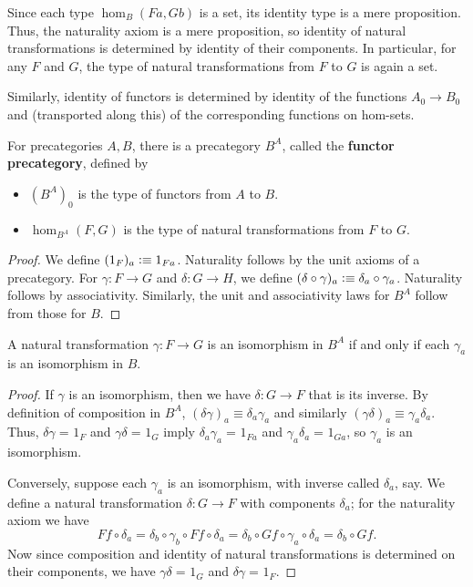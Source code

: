 \documentclass[10pt,a4paper]{article}
\providecommand{\index}[1]{}
\newcommand{\jdeq}{\equiv}      %
\newcommand{\defeq}{\vcentcolon\equiv}  %
\newcommand{\define}[1]{\textbf{#1}}
\newcommand{\id}[3][]{\ensuremath{#2 =_{#1} #3}\xspace}
\theoremstyle{definition}
\theoremstyle{remark}
\numberwithin{equation}{section}
\newcommand{\indexdef}[1]{\index{#1|defstyle}}   %
\begin{document}
Since each type $\hom_B(Fa,Gb)$ is a set, its identity type is a mere proposition.
Thus, the naturality axiom is a mere proposition, so identity of natural transformations is determined by identity of their components.
In particular, for any $F$ and $G$, the type of natural transformations from $F$ to $G$ is again a set.

Similarly, identity of functors is determined by identity of the functions $A_0\to B_0$ and (transported along this) of the corresponding functions on hom-sets.

\begin{defn}\label{ct:functor-precat}
  \indexdef{precategory!of functors}%
  For precategories $A,B$, there is a precategory $B^A$, called the \define{functor precategory}, defined by
  \begin{itemize}
  \item $(B^A)_0$ is the type of functors from $A$ to $B$.
  \item $\hom_{B^A}(F,G)$ is the type of natural transformations from $F$ to $G$.
  \end{itemize}
\end{defn}
\begin{proof}
  We define $(1_F)_a\defeq 1_{Fa}$.
  Naturality follows by the unit axioms of a precategory.
  For $\gamma:F\to G$ and $\delta:G\to H$, we define $(\delta\circ\gamma)_a\defeq \delta_a\circ \gamma_a$.
  Naturality follows by associativity.
  Similarly, the unit and associativity laws for $B^A$ follow from those for $B$.
\end{proof}

\begin{lem}\label{ct:natiso}
  \index{natural!isomorphism}%
  \index{isomorphism!natural}%
  A natural transformation $\gamma:F\to G$ is an isomorphism in $B^A$ if and only if each $\gamma_a$ is an isomorphism in $B$.
\end{lem}
\begin{proof}
  If $\gamma$ is an isomorphism, then we have $\delta:G\to F$ that is its inverse.
  By definition of composition in $B^A$, $(\delta\gamma)_a\jdeq \delta_a\gamma_a$ and similarly $(\gamma\delta)_a\jdeq \gamma_a\delta_a$.
  Thus, $\id{\delta\gamma}{1_F}$ and $\id{\gamma\delta}{1_G}$ imply $\id{\delta_a\gamma_a}{1_{Fa}}$ and $\id{\gamma_a\delta_a}{1_{Ga}}$, so $\gamma_a$ is an isomorphism.

  Conversely, suppose each $\gamma_a$ is an isomorphism, with inverse called $\delta_a$, say.
We define a natural transformation $\delta:G\to F$ with components $\delta_a$; for the naturality axiom we have
  \[ Ff\circ \delta_a = \delta_b\circ \gamma_b\circ Ff \circ \delta_a = \delta_b\circ Gf\circ \gamma_a\circ \delta_a = \delta_b\circ Gf. \]
  Now since composition and identity of natural transformations is determined on their components, we have $\id{\gamma\delta}{1_G}$ and $\id{\delta\gamma}{1_F}$.
\end{proof}
\end{document}
